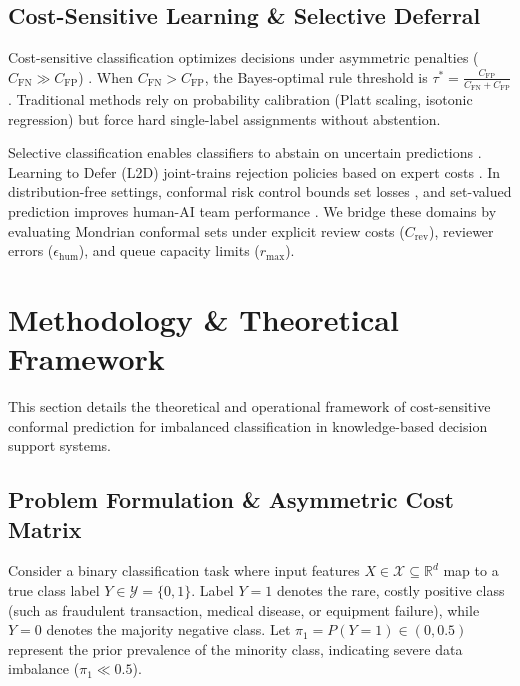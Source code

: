 \documentclass{ieeetj}
\begin{document}
\subsection{Cost-Sensitive Learning \& Selective Deferral}
Cost-sensitive classification optimizes decisions under asymmetric penalties ($C_{\mathrm{FN}} \gg C_{\mathrm{FP}}$) \cite{elkan2001foundations, weiss2004mining, he2009learning}. When $C_{\mathrm{FN}} > C_{\mathrm{FP}}$, the Bayes-optimal rule threshold is $\tau^* = \frac{C_{\mathrm{FP}}}{C_{\mathrm{FN}} + C_{\mathrm{FP}}}$ \cite{elkan2001foundations}. Traditional methods rely on probability calibration (Platt scaling, isotonic regression) \cite{zadrozny2002transforming, guo2017calibration} but force hard single-label assignments without abstention.

Selective classification enables classifiers to abstain on uncertain predictions \cite{chow1970optimum, elyaniv2010foundations, geifman2017selective, cortes2016rejection, geifman2019selectivenet}. Learning to Defer (L2D) joint-trains rejection policies based on expert costs \cite{mozannar2020consistent, hemmer2021complementarity, charoenphakdee2021rejection}. In distribution-free settings, conformal risk control bounds set losses \cite{angelopoulos2024risk}, and set-valued prediction improves human-AI team performance \cite{straitouri2023improving, straitouri2024decision}. We bridge these domains by evaluating Mondrian conformal sets under explicit review costs ($C_{\mathrm{rev}}$), reviewer errors ($\epsilon_{\mathrm{hum}}$), and queue capacity limits ($r_{\max}$).

\section{Methodology \& Theoretical Framework}
\label{sec:methodology}

This section details the theoretical and operational framework of cost-sensitive conformal prediction for imbalanced classification in knowledge-based decision support systems.

\subsection{Problem Formulation \& Asymmetric Cost Matrix}
Consider a binary classification task where input features $X \in \mathcal{X} \subseteq \mathbb{R}^d$ map to a true class label $Y \in \mathcal{Y} = \{0, 1\}$. Label $Y=1$ denotes the rare, costly positive class (such as fraudulent transaction, medical disease, or equipment failure), while $Y=0$ denotes the majority negative class. Let $\pi_1 = P(Y=1) \in (0, 0.5)$ represent the prior prevalence of the minority class, indicating severe data imbalance ($\pi_1 \ll 0.5$).
\end{document}
